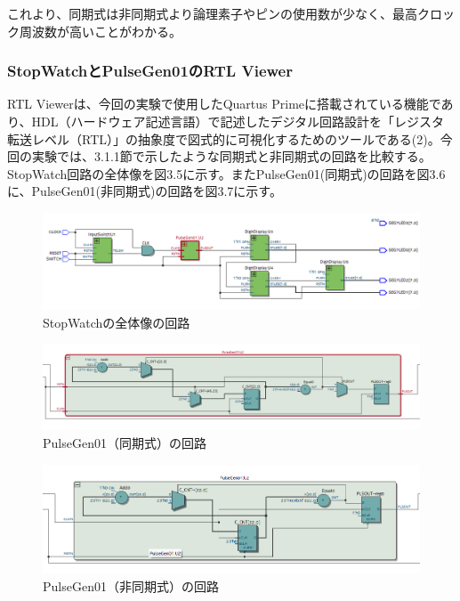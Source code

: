 \documentclass{jlreq}
\numberwithin{equation}{section}
\begin{document}
これより、同期式は非同期式より論理素子やピンの使用数が少なく、最高クロック周波数が高いことがわかる。

\subsubsection{StopWatchとPulseGen01のRTL Viewer}
RTL Viewerは、今回の実験で使用したQuartus Primeに搭載されている機能であり、HDL（ハードウェア記述言語）で記述したデジタル回路設計を「レジスタ転送レベル（RTL）」の抽象度で図式的に可視化するためのツールである(2)。今回の実験では、3.1.1節で示したような同期式と非同期式の回路を比較する。
StopWatch回路の全体像を図3.5に示す。またPulseGen01(同期式)の回路を図3.6に、PulseGen01(非同期式)の回路を図3.7に示す。

\begin{figure}[H]
  \centering
  \includegraphics[width=\textwidth]{assets/RTL_All.png}
  \caption{StopWatchの全体像の回路}
\end{figure}

\begin{figure}[H]
  \centering
  \includegraphics[width=\textwidth]{assets/RTL01.png}
  \caption{PulseGen01（同期式）の回路}
\end{figure}

\begin{figure}[H]
  \centering
  \includegraphics[width=\textwidth]{assets/RTL02.png}
  \caption{PulseGen01（非同期式）の回路}
\end{figure}
\end{document}
